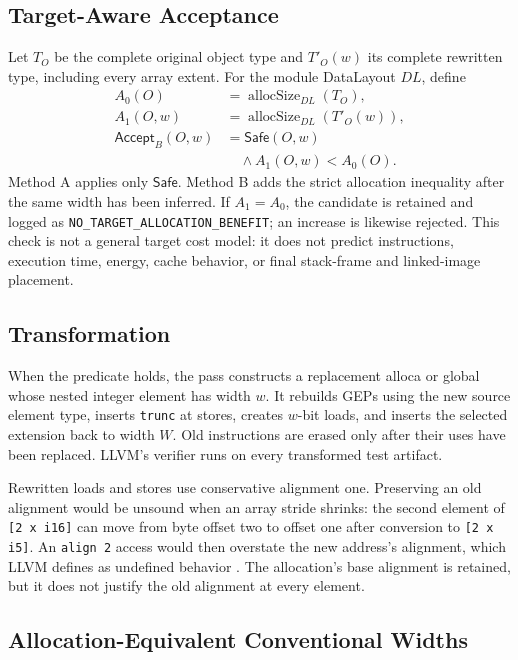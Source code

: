\documentclass[11pt,twocolumn]{article}
\begin{document}
\subsection{Target-Aware Acceptance}

Let $T_O$ be the complete original object type and $T'_O(w)$ its complete
rewritten type, including every array extent. For the module DataLayout $DL$,
define
\begin{align}
 A_0(O)&=\operatorname{allocSize}_{DL}(T_O),\\
 A_1(O,w)&=\operatorname{allocSize}_{DL}(T'_O(w)),\\
 \mathsf{Accept}_{B}(O,w)&=\mathsf{Safe}(O,w)\\
 &\quad\land A_1(O,w)<A_0(O).
\end{align}
Method A applies only $\mathsf{Safe}$. Method B adds the strict allocation
inequality after the same width has been inferred. If $A_1=A_0$, the candidate
is retained and logged as \texttt{NO\_TARGET\_ALLOCATION\_BENEFIT}; an increase
is likewise rejected. This check is not a general target cost model: it does
not predict instructions, execution time, energy, cache behavior, or final
stack-frame and linked-image placement.

\subsection{Transformation}

When the predicate holds, the pass constructs a replacement alloca or global
whose nested integer element has width $w$. It rebuilds GEPs using the new source
element type, inserts \texttt{trunc} at stores, creates $w$-bit loads, and inserts
the selected extension back to width $W$. Old instructions are erased only after
their uses have been replaced. LLVM's verifier runs on every transformed test
artifact.

Rewritten loads and stores use conservative alignment one. Preserving an old
alignment would be unsound when an array stride shrinks: the second element of
\texttt{[2 x i16]} can move from byte offset two to offset one after conversion
to \texttt{[2 x i5]}. An \texttt{align 2} access would then overstate the new
address's alignment, which LLVM defines as undefined behavior
\citep{llvmLangRef}. The allocation's base alignment is retained, but it does
not justify the old alignment at every element.

\subsection{Allocation-Equivalent Conventional Widths}
\end{document}
